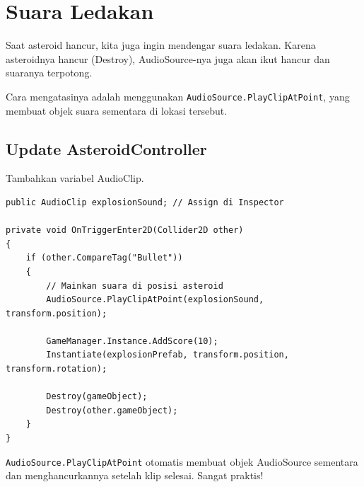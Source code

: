 
\section{Suara Ledakan}

Saat asteroid hancur, kita juga ingin mendengar suara ledakan. Karena asteroidnya hancur (Destroy), AudioSource-nya juga akan ikut hancur dan suaranya terpotong.

Cara mengatasinya adalah menggunakan \texttt{AudioSource.PlayClipAtPoint}, yang membuat objek suara sementara di lokasi tersebut.

\subsection{Update AsteroidController}
Tambahkan variabel AudioClip.

\begin{lstlisting}[language={[Sharp]C}]
public AudioClip explosionSound; // Assign di Inspector

private void OnTriggerEnter2D(Collider2D other)
{
    if (other.CompareTag("Bullet"))
    {
        // Mainkan suara di posisi asteroid
        AudioSource.PlayClipAtPoint(explosionSound, transform.position);
        
        GameManager.Instance.AddScore(10);
        Instantiate(explosionPrefab, transform.position, transform.rotation);
        
        Destroy(gameObject);
        Destroy(other.gameObject);
    }
}
\end{lstlisting}

\begin{tips}
\texttt{AudioSource.PlayClipAtPoint} otomatis membuat objek AudioSource sementara dan menghancurkannya setelah klip selesai. Sangat praktis!
\end{tips}
